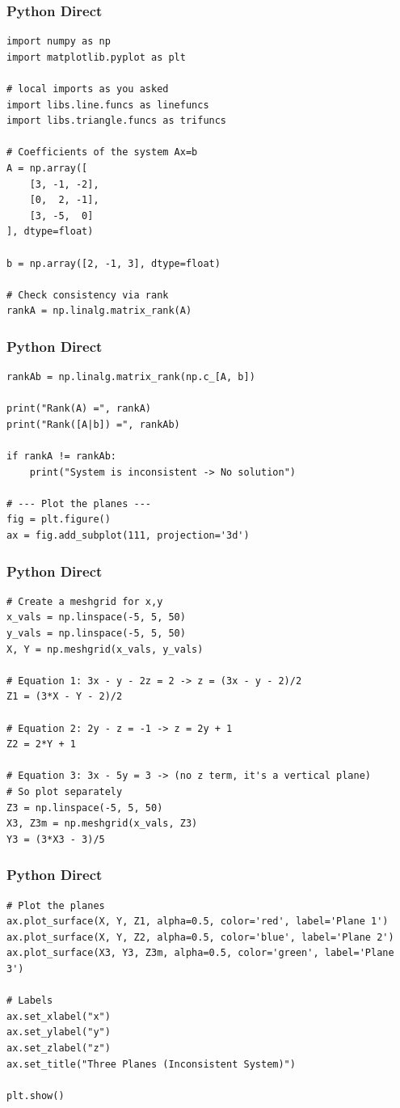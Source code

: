 \documentclass{beamer}
\begin{document}
\begin{frame}[fragile]
\frametitle{Python Direct}
\begin{lstlisting}
import numpy as np
import matplotlib.pyplot as plt

# local imports as you asked
import libs.line.funcs as linefuncs
import libs.triangle.funcs as trifuncs

# Coefficients of the system Ax=b
A = np.array([
    [3, -1, -2],
    [0,  2, -1],
    [3, -5,  0]
], dtype=float)

b = np.array([2, -1, 3], dtype=float)

# Check consistency via rank
rankA = np.linalg.matrix_rank(A)
\end{lstlisting}
\end{frame}
\begin{frame}[fragile]
\frametitle{Python Direct}
\begin{lstlisting}
rankAb = np.linalg.matrix_rank(np.c_[A, b])

print("Rank(A) =", rankA)
print("Rank([A|b]) =", rankAb)

if rankA != rankAb:
    print("System is inconsistent -> No solution")

# --- Plot the planes ---
fig = plt.figure()
ax = fig.add_subplot(111, projection='3d')
\end{lstlisting}
\end{frame}
\begin{frame}[fragile]
\frametitle{Python Direct}
\begin{lstlisting}
# Create a meshgrid for x,y
x_vals = np.linspace(-5, 5, 50)
y_vals = np.linspace(-5, 5, 50)
X, Y = np.meshgrid(x_vals, y_vals)

# Equation 1: 3x - y - 2z = 2 -> z = (3x - y - 2)/2
Z1 = (3*X - Y - 2)/2

# Equation 2: 2y - z = -1 -> z = 2y + 1
Z2 = 2*Y + 1

# Equation 3: 3x - 5y = 3 -> (no z term, it's a vertical plane)
# So plot separately
Z3 = np.linspace(-5, 5, 50)
X3, Z3m = np.meshgrid(x_vals, Z3)
Y3 = (3*X3 - 3)/5
\end{lstlisting}
\end{frame}
\begin{frame}[fragile]
\frametitle{Python Direct}
\begin{lstlisting}
# Plot the planes
ax.plot_surface(X, Y, Z1, alpha=0.5, color='red', label='Plane 1')
ax.plot_surface(X, Y, Z2, alpha=0.5, color='blue', label='Plane 2')
ax.plot_surface(X3, Y3, Z3m, alpha=0.5, color='green', label='Plane 3')

# Labels
ax.set_xlabel("x")
ax.set_ylabel("y")
ax.set_zlabel("z")
ax.set_title("Three Planes (Inconsistent System)")

plt.show()
\end{lstlisting}
\end{frame}
\end{document}
